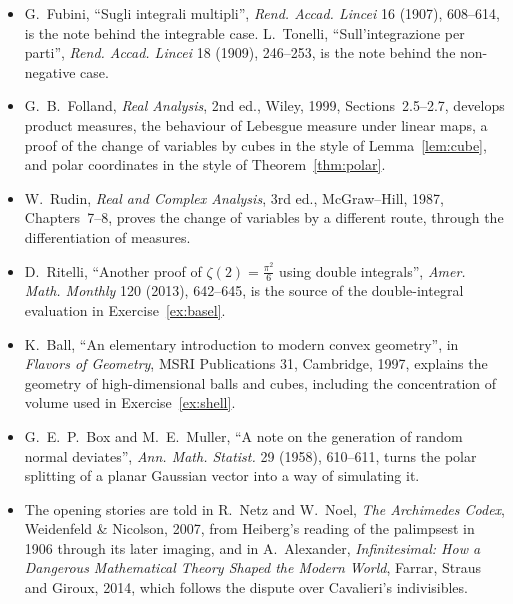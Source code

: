 \begin{itemize}
\item G.~Fubini, ``Sugli integrali multipli'', \emph{Rend. Accad. Lincei} 16 (1907), 608--614, is the note behind the integrable case. L.~Tonelli, ``Sull'integrazione per parti'', \emph{Rend. Accad. Lincei} 18 (1909), 246--253, is the note behind the non-negative case.
\item G.~B.~Folland, \emph{Real Analysis}, 2nd ed., Wiley, 1999, Sections~2.5--2.7, develops product measures, the behaviour of Lebesgue measure under linear maps, a proof of the change of variables by cubes in the style of Lemma~\ref{lem:cube}, and polar coordinates in the style of Theorem~\ref{thm:polar}.
\item W.~Rudin, \emph{Real and Complex Analysis}, 3rd ed., McGraw--Hill, 1987, Chapters~7--8, proves the change of variables by a different route, through the differentiation of measures.
\item D.~Ritelli, ``Another proof of $\zeta(2)=\frac{\pi^2}6$ using double integrals'', \emph{Amer. Math. Monthly} 120 (2013), 642--645, is the source of the double-integral evaluation in Exercise~\ref{ex:basel}.
\item K.~Ball, ``An elementary introduction to modern convex geometry'', in \emph{Flavors of Geometry}, MSRI Publications 31, Cambridge, 1997, explains the geometry of high-dimensional balls and cubes, including the concentration of volume used in Exercise~\ref{ex:shell}.
\item G.~E.~P.~Box and M.~E.~Muller, ``A note on the generation of random normal deviates'', \emph{Ann. Math. Statist.} 29 (1958), 610--611, turns the polar splitting of a planar Gaussian vector into a way of simulating it.
\item The opening stories are told in R.~Netz and W.~Noel, \emph{The Archimedes Codex}, Weidenfeld \& Nicolson, 2007, from Heiberg's reading of the palimpsest in 1906 through its later imaging, and in A.~Alexander, \emph{Infinitesimal: How a Dangerous Mathematical Theory Shaped the Modern World}, Farrar, Straus and Giroux, 2014, which follows the dispute over Cavalieri's indivisibles.
\end{itemize}
